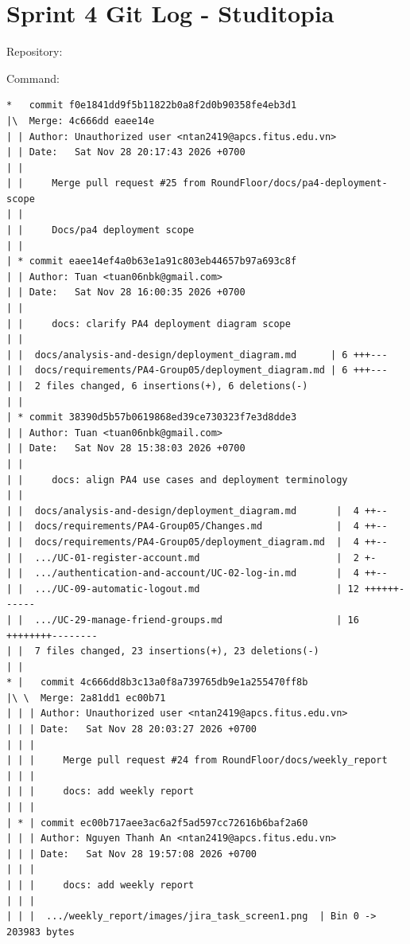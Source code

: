 \documentclass[12pt]{article}
\begin{document}

\section{Sprint 4 Git Log - Studitopia}

Repository: \texttt{}

Command: \texttt{}

\begin{lstlisting}[numbers=none,breaklines=true]
*   commit f0e1841dd9f5b11822b0a8f2d0b90358fe4eb3d1
|\  Merge: 4c666dd eaee14e
| | Author: Unauthorized user <ntan2419@apcs.fitus.edu.vn>
| | Date:   Sat Nov 28 20:17:43 2026 +0700
| |
| |     Merge pull request #25 from RoundFloor/docs/pa4-deployment-scope
| |
| |     Docs/pa4 deployment scope
| |
| * commit eaee14ef4a0b63e1a91c803eb44657b97a693c8f
| | Author: Tuan <tuan06nbk@gmail.com>
| | Date:   Sat Nov 28 16:00:35 2026 +0700
| |
| |     docs: clarify PA4 deployment diagram scope
| |
| |  docs/analysis-and-design/deployment_diagram.md      | 6 +++---
| |  docs/requirements/PA4-Group05/deployment_diagram.md | 6 +++---
| |  2 files changed, 6 insertions(+), 6 deletions(-)
| |
| * commit 38390d5b57b0619868ed39ce730323f7e3d8dde3
| | Author: Tuan <tuan06nbk@gmail.com>
| | Date:   Sat Nov 28 15:38:03 2026 +0700
| |
| |     docs: align PA4 use cases and deployment terminology
| |
| |  docs/analysis-and-design/deployment_diagram.md       |  4 ++--
| |  docs/requirements/PA4-Group05/Changes.md             |  4 ++--
| |  docs/requirements/PA4-Group05/deployment_diagram.md  |  4 ++--
| |  .../UC-01-register-account.md                        |  2 +-
| |  .../authentication-and-account/UC-02-log-in.md       |  4 ++--
| |  .../UC-09-automatic-logout.md                        | 12 ++++++------
| |  .../UC-29-manage-friend-groups.md                    | 16 ++++++++--------
| |  7 files changed, 23 insertions(+), 23 deletions(-)
| |
* |   commit 4c666dd8b3c13a0f8a739765db9e1a255470ff8b
|\ \  Merge: 2a81dd1 ec00b71
| | | Author: Unauthorized user <ntan2419@apcs.fitus.edu.vn>
| | | Date:   Sat Nov 28 20:03:27 2026 +0700
| | |
| | |     Merge pull request #24 from RoundFloor/docs/weekly_report
| | |
| | |     docs: add weekly report
| | |
| * | commit ec00b717aee3ac6a2f5ad597cc72616b6baf2a60
| | | Author: Nguyen Thanh An <ntan2419@apcs.fitus.edu.vn>
| | | Date:   Sat Nov 28 19:57:08 2026 +0700
| | |
| | |     docs: add weekly report
| | |
| | |  .../weekly_report/images/jira_task_screen1.png  | Bin 0 -> 203983 bytes

\end{lstlisting}
\end{document}
